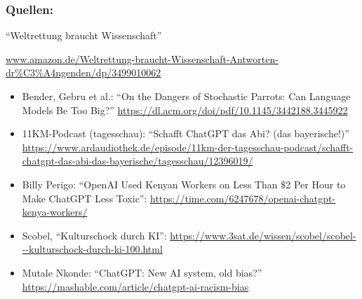 \documentclass[aspectratio=169,usenames,dvipsnames]{beamer}
\begin{document}
\begin{frame}[fragile]
\frametitle{Quellen:}
\scriptsize
\begin{center}
``Weltrettung braucht Wissenschaft''

\url{www.amazon.de/Weltrettung-braucht-Wissenschaft-Antworten-dr%C3%A4ngenden/dp/3499010062}
\end{center}
\medskip

\begin{itemize}
\item Bender, Gebru et al.: ``On the Dangers of Stochastic Parrots: Can Language Models Be Too Big?'' \url{https://dl.acm.org/doi/pdf/10.1145/3442188.3445922}
\item 11KM-Podcast (tagesschau): ``Schafft ChatGPT das Abi? (das bayerische!)'' \url{https://www.ardaudiothek.de/episode/11km-der-tagesschau-podcast/schafft-chatgpt-das-abi-das-bayerische/tagesschau/12396019/}
\item Billy Perigo: ``OpenAI Used Kenyan Workers on Less Than $\$$2 Per Hour to Make ChatGPT Less Toxic'': \url{https://time.com/6247678/openai-chatgpt-kenya-workers/}
\item Scobel, ``Kulturschock durch KI'': \url{https://www.3sat.de/wissen/scobel/scobel---kulturschock-durch-ki-100.html}
\item Mutale Nkonde: ``ChatGPT: New AI system, old bias?'' \url{https://mashable.com/article/chatgpt-ai-racism-bias}
\end{itemize}
\end{frame}
\end{document}
